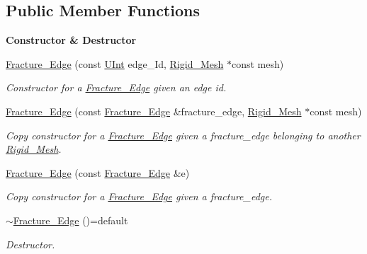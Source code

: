 \subsection*{Public Member Functions}
\begin{Indent}{\bf Constructor \& Destructor}\par
\begin{DoxyCompactItemize}
\item 
\hyperlink{classFVCode3D_1_1Rigid__Mesh_1_1Fracture__Edge_a9b7b4e922c35eb8e83bc3209b4a668f2}{Fracture\+\_\+\+Edge} (const \hyperlink{namespaceFVCode3D_a4bf7e328c75d0fd504050d040ebe9eda}{U\+Int} edge\+\_\+\+Id, \hyperlink{classFVCode3D_1_1Rigid__Mesh}{Rigid\+\_\+\+Mesh} $\ast$const mesh)
\begin{DoxyCompactList}\small\item\em Constructor for a \hyperlink{classFVCode3D_1_1Rigid__Mesh_1_1Fracture__Edge}{Fracture\+\_\+\+Edge} given an edge id. \end{DoxyCompactList}\item 
\hyperlink{classFVCode3D_1_1Rigid__Mesh_1_1Fracture__Edge_a011ab1f44d95fae370f49ab2e561f0c6}{Fracture\+\_\+\+Edge} (const \hyperlink{classFVCode3D_1_1Rigid__Mesh_1_1Fracture__Edge}{Fracture\+\_\+\+Edge} \&fracture\+\_\+edge, \hyperlink{classFVCode3D_1_1Rigid__Mesh}{Rigid\+\_\+\+Mesh} $\ast$const mesh)
\begin{DoxyCompactList}\small\item\em Copy constructor for a \hyperlink{classFVCode3D_1_1Rigid__Mesh_1_1Fracture__Edge}{Fracture\+\_\+\+Edge} given a fracture\+\_\+edge belonging to another \hyperlink{classFVCode3D_1_1Rigid__Mesh}{Rigid\+\_\+\+Mesh}. \end{DoxyCompactList}\item 
\hyperlink{classFVCode3D_1_1Rigid__Mesh_1_1Fracture__Edge_a9e674edb76a432728a81061ac946825b}{Fracture\+\_\+\+Edge} (const \hyperlink{classFVCode3D_1_1Rigid__Mesh_1_1Fracture__Edge}{Fracture\+\_\+\+Edge} \&e)
\begin{DoxyCompactList}\small\item\em Copy constructor for a \hyperlink{classFVCode3D_1_1Rigid__Mesh_1_1Fracture__Edge}{Fracture\+\_\+\+Edge} given a fracture\+\_\+edge. \end{DoxyCompactList}\item 
\hyperlink{classFVCode3D_1_1Rigid__Mesh_1_1Fracture__Edge_a9658861420c0daca3571f4ebb048fba2}{$\sim$\+Fracture\+\_\+\+Edge} ()=default
\begin{DoxyCompactList}\small\item\em Destructor. \end{DoxyCompactList}\end{DoxyCompactItemize}
\end{Indent}
